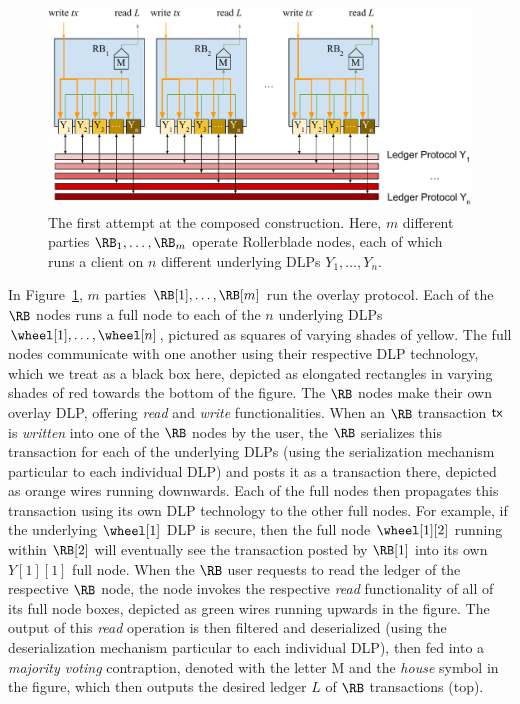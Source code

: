 \begin{figure}
    \centering
    \includegraphics[width=\textwidth,keepaspectratio]{figures/rollerblade-naive-construction.pdf}
    \caption{The first attempt at the composed construction. Here,
             $m$ different parties $\RB_1, \ldots, \RB_m$ operate Rollerblade
             nodes, each of which runs a client on $n$ different underlying
             DLPs $Y_1, \ldots, Y_n$.}
    \label{fig.naive}
\end{figure}

In Figure~\ref{fig.naive}, $m$ parties $\RB[1], \ldots, \RB[m]$ run the overlay protocol.
Each of the $\RB$ nodes runs
a full node to each of the $n$ underlying DLPs $\wheel[1], \ldots, \wheel[n]$, pictured as squares
of varying shades of yellow. The full nodes communicate with one another using their
respective DLP technology, which we treat as a black box here, depicted as elongated
rectangles in varying shades of red towards the bottom of the figure. The $\RB$ nodes
make their own overlay DLP, offering \emph{read} and \emph{write} functionalities.
When an $\RB$ transaction $\textsf{tx}$ is \emph{written} into one of the $\RB$ nodes by the user,
the $\RB$ serializes this transaction for each of the underlying DLPs (using the
serialization mechanism particular to each individual DLP) and posts it
as a transaction there, depicted as orange wires running downwards. Each of the
full nodes then propagates this transaction using its own DLP technology to the
other full nodes. For example, if the underlying $\wheel[1]$ DLP is secure, then
the full node $\wheel[1][2]$ running within $\RB[2]$ will eventually see the transaction
posted by $\RB[1]$ into its own $Y[1][1]$ full node. When the $\RB$ user requests to read the
ledger of the respective $\RB$ node, the node invokes the respective \emph{read}
functionality of all of its full node boxes, depicted as green wires running upwards
in the figure. The output of this \emph{read} operation is then filtered and deserialized
(using the deserialization mechanism particular to each individual DLP), then fed into a
\emph{majority voting} contraption, denoted with the letter M and the \emph{house} symbol
in the figure, which then outputs the desired ledger $L$ of $\RB$ transactions (top).

